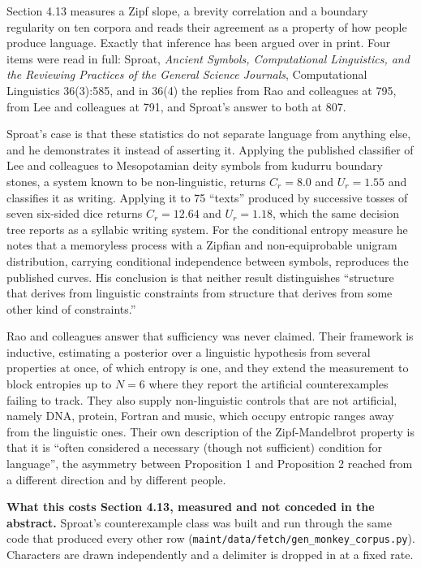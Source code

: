 Section 4.13 measures a Zipf slope, a brevity correlation and a boundary regularity on ten corpora and reads their agreement as a property of how people produce language. Exactly that inference has been argued over in print. Four items were read in full: Sproat, \emph{Ancient Symbols, Computational Linguistics, and the Reviewing Practices of the General Science Journals}, Computational Linguistics 36(3):585, and in 36(4) the replies from Rao and colleagues at 795, from Lee and colleagues at 791, and Sproat's answer to both at 807.

Sproat's case is that these statistics do not separate language from anything else, and he demonstrates it instead of asserting it. Applying the published classifier of Lee and colleagues to Mesopotamian deity symbols from kudurru boundary stones, a system known to be non-linguistic, returns \(C_r = 8.0\) and \(U_r = 1.55\) and classifies it as writing. Applying it to 75 ``texts'' produced by successive tosses of seven six-sided dice returns \(C_r = 12.64\) and \(U_r = 1.18\), which the same decision tree reports as a syllabic writing system. For the conditional entropy measure he notes that a memoryless process with a Zipfian and non-equiprobable unigram distribution, carrying conditional independence between symbols, reproduces the published curves. His conclusion is that neither result distinguishes ``structure that derives from linguistic constraints from structure that derives from some other kind of constraints.''

Rao and colleagues answer that sufficiency was never claimed. Their framework is inductive, estimating a posterior over a linguistic hypothesis from several properties at once, of which entropy is one, and they extend the measurement to block entropies up to \(N = 6\) where they report the artificial counterexamples failing to track. They also supply non-linguistic controls that are not artificial, namely DNA, protein, Fortran and music, which occupy entropic ranges away from the linguistic ones. Their own description of the Zipf-Mandelbrot property is that it is ``often considered a necessary (though not sufficient) condition for language'', the asymmetry between Proposition 1 and Proposition 2 reached from a different direction and by different people.

\noindent\textbf{What this costs Section 4.13, measured and not conceded in the abstract.} Sproat's counterexample class was built and run through the same code that produced every other row (\texttt{maint/\allowbreak{}data/\allowbreak{}fetch/\allowbreak{}gen\_\allowbreak{}monkey\_\allowbreak{}corpus.\allowbreak{}py}). Characters are drawn independently and a delimiter is dropped in at a fixed rate.

